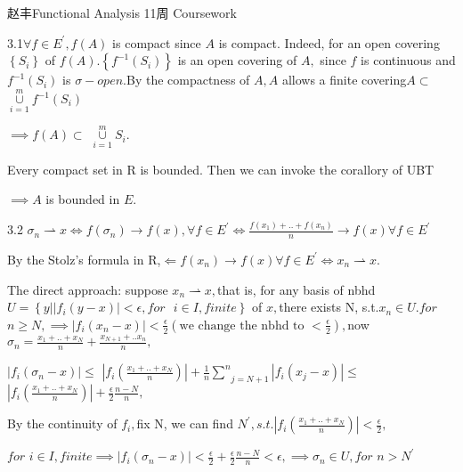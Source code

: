 \documentclass{article}
\begin{document}
\bigskip \bigskip 赵丰\qquad \qquad Functional
Analysis 11周 Coursework

3.1$\forall f\in E^{\prime },f\left( A\right) $ is compact since $A$ is
compact. Indeed, for an open covering $\left\{ S_{i}\right\} $ of $f\left(
A\right) .\left\{ f^{-1}\left( S_{i}\right) \right\} $ is an open covering
of $A,$ since $f$ is continuous and $f^{-1}\left( S_{i}\right) $ is $\sigma
-open.$By the compactness of $A,A$ allows a finite covering$A\subset $ $%
\underset{i=1}{\overset{m}{\cup }}f^{-1}\left( S_{i}\right) $

$\implies f\left( A\right) \subset $ $\underset{i=1}{\overset{m}{\cup }}%
S_{i}.$

Every compact set in R is bounded. Then we can invoke the corallory of UBT

$\implies A$ is bounded in $E.$

3.2 $\sigma _{n}\rightharpoonup x\iff f\left( \sigma _{n}\right) \rightarrow
f\left( x\right) ,\forall f\in E^{\prime }\iff \frac{f\left( x_{1}\right)
+..+f\left( x_{n}\right) }{n}\rightarrow f\left( x\right) \forall f\in
E^{\prime }$

By the Stolz's formula in R,$\Longleftarrow f\left( x_{n}\right) \rightarrow
f\left( x\right) \forall f\in E^{\prime }\iff x_{n}\rightharpoonup x.$

The direct approach: suppose $x_{n}\rightharpoonup x,$that is, for any basis
of nbhd $U=\left\{ y|\left\vert f_{i}\left( y-x\right) \right\vert <\epsilon
,for\text{ }i\in I,finite\right\} $ of $x,$there exists N, s.t.$x_{n}\in
U.for$ $n\geq N,\implies \left\vert f_{i}\left( x_{n}-x\right) \right\vert <%
\frac{\epsilon }{2}\left( \text{we change the nbhd to }<\frac{\epsilon }{2}%
\right) ,$now $\sigma _{n}=\frac{x_{1}+..+x_{N}}{n}+\frac{x_{N+1}+..x_{n}}{n}%
,$

$\left\vert f_{i}\left( \sigma _{n}-x\right) \right\vert \leq $ $\left\vert
f_{i}\left( \frac{x_{1}+..+x_{N}}{n}\right) \right\vert +\frac{1}{n}\underset%
{j=N+1}{\overset{n}{\sum }}\left\vert f_{i}\left( x_{j}-x\right) \right\vert
\leq $ $\left\vert f_{i}\left( \frac{x_{1}+..+x_{N}}{n}\right) \right\vert +%
\frac{\epsilon }{2}\frac{n-N}{n},$

By the continuity of $f_{i},$fix N, we can find $N^{\prime },s.t.\left\vert
f_{i}\left( \frac{x_{1}+..+x_{N}}{n}\right) \right\vert <\frac{\epsilon }{2}%
, $

$for$ $i\in I,finite\implies \left\vert f_{i}\left( \sigma _{n}-x\right)
\right\vert <\frac{\epsilon }{2}+\frac{\epsilon }{2}\frac{n-N}{n}<\epsilon
,\implies \sigma _{n}\in U,for$ $n>N^{\prime }$
\end{document}

